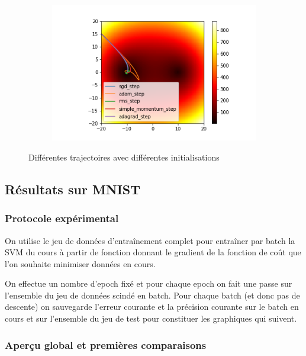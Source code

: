 \documentclass[fleqn,11pt, titlepage, french]{article}
\begin{document}
\begin{figure}[H]
\begin{subfigure}{0.45\textwidth}
\end{subfigure}
\begin{subfigure}{0.45\textwidth}
	\centering
	\includegraphics[scale=0.5]{../gdsvm/exports/init-3.png}
\end{subfigure}
\caption{Différentes trajectoires avec différentes initialisations}
	\end{figure}

	
	\subsection{Résultats sur MNIST}
	
	\subsubsection{Protocole expérimental}
	
	On utilise le jeu de données d'entraînement complet pour entraîner par batch la SVM du cours à partir de fonction donnant le gradient de la fonction de coût que l'on souhaite minimiser données en cours.
	
	On effectue un nombre d'epoch fixé et pour chaque epoch on fait une passe sur l'ensemble du jeu de données scindé en batch. Pour chaque batch (et donc pas de descente) on sauvegarde l'erreur courante et la précision courante sur le batch en cours et sur l'ensemble du jeu de test pour constituer les graphiques qui suivent.
	
	\subsubsection{Aperçu global et premières comparaisons}
	
\end{document}

